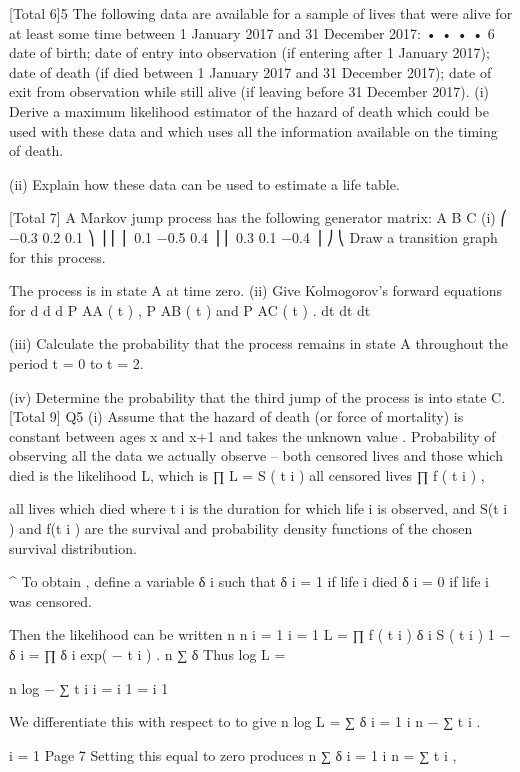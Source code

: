 \documentclass[a4paper,12pt]{article}
\begin{document}
[Total 6]5
The following data are available for a sample of lives that were alive for at least some
time between 1 January 2017 and 31 December 2017:
•
•
•
•
6
date of birth;
date of entry into observation (if entering after 1 January 2017);
date of death (if died between 1 January 2017 and 31 December 2017);
date of exit from observation while still alive (if leaving before 31 December
2017).
(i) Derive a maximum likelihood estimator of the hazard of death which could be
used with these data and which uses all the information available on the timing
of death.

(ii)
 Explain how these data can be used to estimate a life table.

[Total 7]
A Markov jump process has the following generator matrix:
A
B
C
(i)
⎛ −0.3 0.2 0.1 ⎞
⎟
⎜
⎜ 0.1 −0.5 0.4 ⎟
⎜ 0.3 0.1 −0.4 ⎟
⎠
⎝
Draw a transition graph for this process.

The process is in state A at time zero.
(ii)
Give Kolmogorov’s forward equations for
d
d
d
P AA ( t ) ,
P AB ( t ) and
P AC ( t ) .
dt
dt
dt

(iii) Calculate the probability that the process remains in state A throughout the
period t = 0 to t = 2.

(iv)
 Determine the probability that the third jump of the process is into state C.
[Total 9]
Q5
(i)
Assume that the hazard of death (or force of mortality) is constant
between ages x and x+1 and takes the unknown value \mu.
Probability of observing all the data we actually observe – both
censored lives and those which died is the likelihood L, which is
∏
L =
S ( t i )
all censored lives
∏
f ( t i ) ,

all lives which died
where t i is the duration for which life i is observed, and S(t i ) and f(t i )
are the survival and probability density functions of the chosen survival
distribution.

^
To obtain \mu , define a variable δ i such that
δ i = 1 if life i died
δ i = 0 if life i was censored.

Then the likelihood can be written
n n
i = 1 i = 1
L = ∏ f ( t i ) δ i S ( t i ) 1 − δ i = ∏ \mu δ i exp( − \mu t i ) .
n
∑ δ
Thus
log L
=

n
log \mu − ∑ \mu t i
i
= i 1 = i 1

We differentiate this with respect to \mu to give
n
\partial log L
=
\partial \mu
∑ δ
i = 1
\mu
i
n
− ∑ t i .

i = 1
Page 7
Setting this equal to zero produces
n
∑ δ
i = 1
\mu
i
n
= ∑ t i ,
\end{document}
